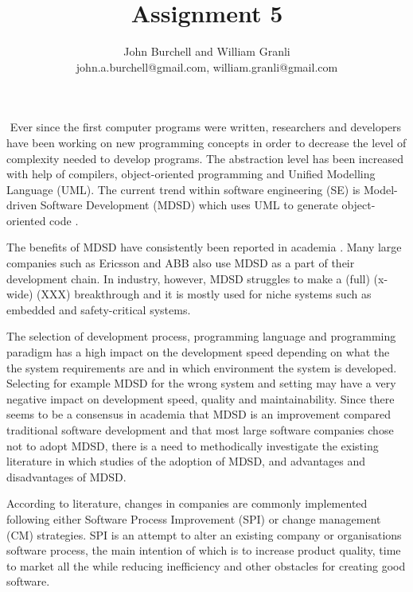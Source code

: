 \documentclass[10pt,twocolumn]{article}
\begin{document}
\title{Assignment 5}

\author{John Burchell and William Granli \\
john.a.burchell@gmail.com, william.granli@gmail.com}


\maketitle
\thispagestyle{empty}




​
Ever since the first computer programs were written, researchers and developers have been working on new programming concepts in order to decrease the level of complexity needed to develop programs. The abstraction level has been increased with help of compilers, object-oriented programming and Unified Modelling Language (UML). The current trend within software engineering (SE) is Model-driven Software Development (MDSD) which uses UML to generate object-oriented code \cite{staron2006adopting}. 

The benefits of MDSD have consistently been reported in academia \cite{staron2006adopting} \cite{volter2013model}. Many large companies such as Ericsson and ABB \cite{staron2006adopting} also use MDSD as a part of their development chain. In industry, however, MDSD struggles to make a (full) (x-wide) (XXX) breakthrough and it is mostly used for niche systems such as embedded and safety-critical systems.

The selection of development process, programming language and programming paradigm has a high impact on the development speed depending on what the the system requirements are and in which environment the system is developed. Selecting for example MDSD for the wrong system and setting may have a very negative impact on development speed, quality and maintainability. Since there seems to be a consensus in academia that MDSD is an improvement compared traditional software development \cite{staron2006adopting} \cite{volter2013model} and that most large software companies chose not to adopt MDSD, there is a need to methodically investigate the existing literature in which studies of the adoption of MDSD, and advantages and disadvantages of MDSD. 

According to literature, changes in companies are commonly implemented following either Software Process Improvement (SPI)\cite{pettersson2008practitioner}\cite{unterkalmsteiner2012evaluation} or change management (CM) strategies. SPI is an attempt to alter an existing company or organisations software process, the main intention of which is to increase product quality, time to market all the while reducing inefficiency and other obstacles for creating good software. 
\end{document}
